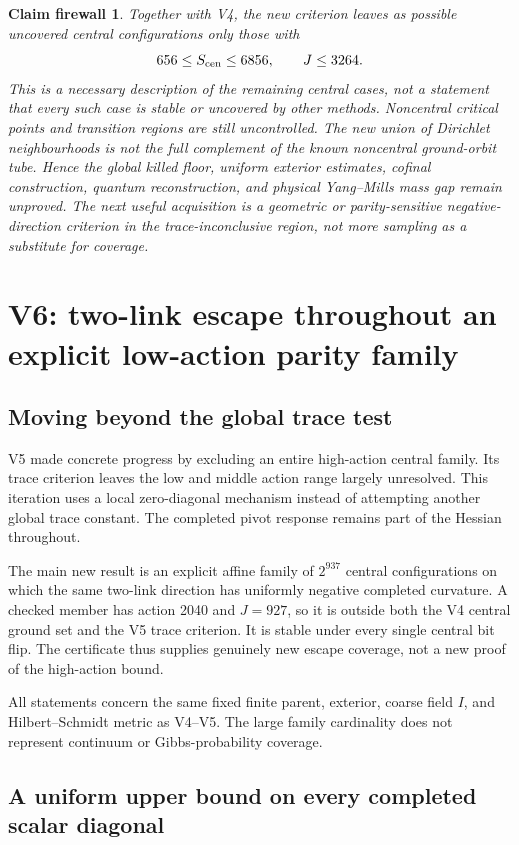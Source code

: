 \documentclass[11pt,oneside]{article}
\newtheorem{firewall}[theorem]{Claim firewall}
\begin{document}
\begin{firewall}
Together with V4, the new criterion leaves as
possible uncovered central configurations only
those with
\[
 656\le S_{\rm cen}\le6856,\qquad J\le3264.
\]
This is a necessary description of the remaining
central cases, not a statement that every such
case is stable or uncovered by other methods.
Noncentral critical points and transition regions
are still uncontrolled. The new union of Dirichlet
neighbourhoods is not the full complement of the
known noncentral ground-orbit tube. Hence the
global killed floor, uniform exterior estimates,
cofinal construction, quantum reconstruction, and
physical Yang--Mills mass gap remain unproved.
The next useful acquisition is a geometric or
parity-sensitive negative-direction criterion in
the trace-inconclusive region, not more sampling
as a substitute for coverage.
\end{firewall}
\section{V6: two-link escape throughout an explicit low-action parity family}
\label{sec:f13v6}

\subsection{Moving beyond the global trace test}

V5 made concrete progress by excluding an entire
high-action central family. Its trace criterion
leaves the low and middle action range largely
unresolved. This iteration uses a local zero-diagonal
mechanism instead of attempting another global
trace constant. The completed pivot response remains
part of the Hessian throughout.

The main new result is an explicit affine family
of \(2^{937}\) central configurations on which the
same two-link direction has uniformly negative
completed curvature. A checked member has action
2040 and \(J=927\), so it is outside both the V4
central ground set and the V5 trace criterion.
It is stable under every single central bit flip.
The certificate thus supplies genuinely new escape
coverage, not a new proof of the high-action bound.

All statements concern the same fixed finite
parent, exterior, coarse field \(I\), and
Hilbert--Schmidt metric as V4--V5. The large family
cardinality does not represent continuum or
Gibbs-probability coverage.

\subsection{A uniform upper bound on every completed scalar diagonal}
\end{document}
